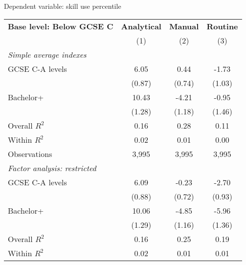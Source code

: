 \begin{center}
\begin{threeparttable}[!h]
\caption{Dependent variable: skill use percentile}
\label{tab:skillRegs}
\begin{tabular}{lccc}
\toprule
\toprule
\textbf{Base level: Below GCSE C}&\multicolumn{1}{c}{\textbf{Analytical}}&\multicolumn{1}{c}{\textbf{Manual}}&\multicolumn{1}{c}{\textbf{Routine}} \\
&\multicolumn{1}{c}{(1)}&\multicolumn{1}{c}{(2)}&\multicolumn{1}{c}{(3)} \\
\midrule
\textit{Simple average indexes} \vspace{1mm}\\ 
\hspace{3mm}GCSE C-A levels&        6.05\sym{***}&        0.44         &       -1.73         \\
                    &      (0.87)         &      (0.74)         &      (1.03)         \\
\hspace{3mm}Bachelor+&       10.43\sym{***}&       -4.21\sym{***}&       -0.95         \\
                    &      (1.28)         &      (1.18)         &      (1.46)         \\
\midrule Overall $ R^2$&        0.16         &        0.28         &        0.11         \\
Within $ R^2$       &        0.02         &        0.01         &        0.00         \\
Observations        &       3,995         &       3,995         &       3,995         \\
\midrule\vspace{1mm} \textit{Factor analysis: restricted} \\ 
\hspace{3mm}GCSE C-A levels&        6.09\sym{***}&       -0.23         &       -2.70\sym{**} \\
                    &      (0.88)         &      (0.72)         &      (0.93)         \\
\hspace{3mm}Bachelor+&       10.06\sym{***}&       -4.85\sym{***}&       -5.96\sym{***}\\
                    &      (1.29)         &      (1.16)         &      (1.36)         \\
\midrule Overall $ R^2$&        0.16         &        0.25         &        0.19         \\
Within $ R^2$       &        0.02         &        0.01         &        0.01         \\

\end{tabular}
\end{threeparttable}
\end{center}

